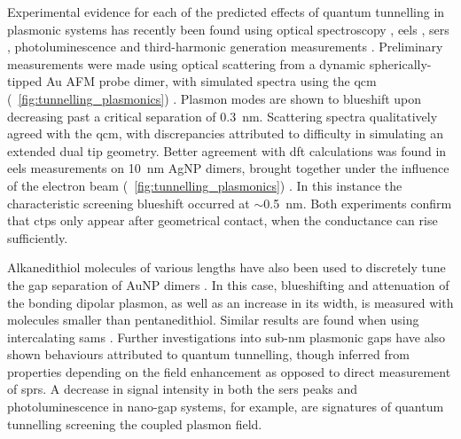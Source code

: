 \documentclass{article}
\begin{document}
Experimental evidence for each of the predicted effects of quantum tunnelling in plasmonic systems has recently been found using optical spectroscopy \cite{savage2012, cha2014, zhu2014}, \gls{eels} \cite{scholl2013}, \gls{sers} \cite{zhu2014}, photoluminescence \cite{kravtsov2014} and third-harmonic generation measurements \cite{hajisalem2014}.
Preliminary measurements were made using optical scattering from a dynamic spherically-tipped Au AFM probe dimer, with simulated spectra using the \gls{qcm} (\figurename~\ref{fig:tunnelling_plasmonics}) \cite{savage2012}. Plasmon modes are shown to blueshift upon decreasing past a critical separation of \SI{0.3}{nm}. Scattering spectra qualitatively agreed with the \gls{qcm}, with discrepancies attributed to difficulty in simulating an extended dual tip geometry. Better agreement with \gls{dft} calculations was found in \gls{eels} measurements on \SI{10}{nm} AgNP dimers, brought together under the influence of the electron beam (\figurename~\ref{fig:tunnelling_plasmonics}) \cite{scholl2013}. In this instance the characteristic screening blueshift occurred at $\sim$\SI{0.5}{nm}. Both experiments confirm that \glspl{ctp} only appear after geometrical contact, when the conductance can rise sufficiently.

Alkanedithiol molecules of various lengths have also been used to discretely tune the gap separation of AuNP dimers \cite{cha2014}. In this case, blueshifting and attenuation of the bonding dipolar plasmon, as well as an increase in its width, is measured with molecules smaller than pentanedithiol. Similar results are found when using intercalating \glspl{sam} \cite{tan2014}.
Further investigations into sub-nm plasmonic gaps have also shown behaviours attributed to quantum tunnelling, though inferred from properties depending on the field enhancement as opposed to direct measurement of \glspl{spr}. A decrease in signal intensity in both the \gls{sers} peaks \cite{zhu2014} and photoluminescence \cite{kravtsov2014} in nano-gap systems, for example, are signatures of quantum tunnelling screening the coupled plasmon field.
\end{document}
